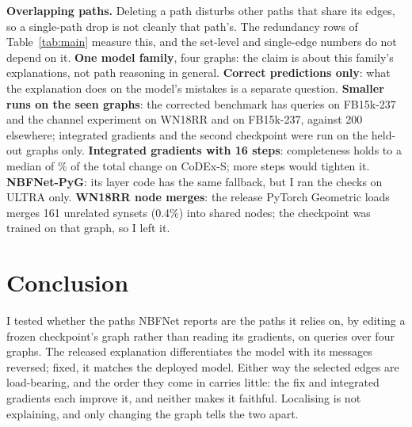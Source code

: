 \documentclass[10pt,twocolumn,letterpaper]{article}
\begin{document}
\textbf{Overlapping paths.} Deleting a path disturbs other paths that share its
edges, so a single-path drop is not cleanly that path's. The redundancy rows
of Table~\ref{tab:main} measure this, and the set-level and single-edge
numbers do not depend on it. \textbf{One model family}, four graphs:
the claim is about this family's explanations, not path reasoning in general.
\textbf{Correct predictions only}: what the explanation does on the model's
mistakes is a separate question. \textbf{Smaller runs on the seen graphs}: the corrected benchmark has
\fbFxN{} queries on FB15k-237 and the channel experiment \wnNmN{} on WN18RR
and \fbNmN{} on FB15k-237, against 200 elsewhere; integrated gradients and the
second checkpoint were run on the held-out graphs only. \textbf{Integrated
gradients with 16 steps}: completeness holds to a median of
\cxIgCompGapRel\% of the total change on CoDEx-S; more steps would tighten
it. \textbf{NBFNet-PyG}: its layer code has the same fallback, but I ran the
checks on ULTRA only.
\textbf{WN18RR node merges}: the release PyTorch Geometric loads merges 161
unrelated synsets (0.4\%) into shared nodes; the checkpoint was trained on
that graph, so I left it.

\section{Conclusion}

I tested whether the paths NBFNet reports are the paths it relies on, by
editing a frozen checkpoint's graph rather than reading its gradients, on
\allQueries{} queries over four graphs. The released explanation
differentiates the model with its messages reversed; fixed, it matches the
deployed model. Either way the selected edges are load-bearing, and the order
they come in carries little: the fix and integrated gradients each improve
it, and neither makes it faithful. Localising is not explaining, and only
changing the graph tells the two apart.

{\small


}
\end{document}

